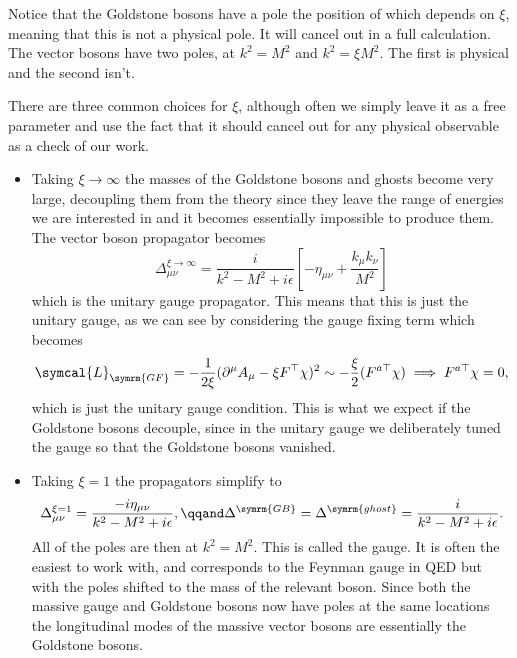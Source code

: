 \documentclass[fleqn]{NotesClass}
\newcommand{\lagrangianDensity}{\symcal{L}}
\newcommand{\minkowskiMetric}{\eta}
\newcommand{\trans}{\top}
\begin{document}
    Notice that the Goldstone bosons have a pole the position of which depends on \(\xi\), meaning that this is not a physical pole.
    It will cancel out in a full calculation.
    The vector bosons have two poles, at \(k^2 = M^2\) and \(k^2 = \xi M^2\).
    The first is physical and the second isn't.
    
    There are three common choices for \(\xi\), although often we simply leave it as a free parameter and use the fact that it should cancel out for any physical observable as a check of our work.
    \begin{itemize}
        \item Taking \(\xi \to \infty\) the masses of the Goldstone bosons and ghosts become very large, decoupling them from the theory since they leave the range of energies we are interested in and it becomes essentially impossible to produce them.
        The vector boson propagator becomes
        \begin{equation}
            \Delta_{\mu\nu}^{\xi \to \infty} = \frac{i}{k^2 - M^2 + i\epsilon} \left[ -\minkowskiMetric_{\mu\nu} + \frac{k_\mu k_\nu}{M^2} \right]
        \end{equation}
        which is the unitary gauge propagator.
        This means that this is just the unitary gauge, as we can see by considering the gauge fixing term which becomes
        \begin{equation}
            \lagrangianDensity_{\symrm{GF}} = -\frac{1}{2\xi}(\partial^\mu A_\mu - \xi F^\trans \chi)^2 \sim -\frac{\xi}{2}(F^{a\trans} \chi) \implies F^{a\trans}\chi = 0,
        \end{equation}
        which is just the unitary gauge condition.
        This is what we expect if the Goldstone bosons decouple, since in the unitary gauge we deliberately tuned the gauge so that the Goldstone bosons vanished.
        
        \item Taking \(\xi = 1\) the propagators simplify to
        \begin{equation*}
            \Delta_{\mu\nu}^{\xi = 1} = \frac{-i\minkowskiMetric_{\mu\nu}}{k^2 - M^2 + i\epsilon}, \qqand \Delta^{\symrm{GB}} = \Delta^{\symrm{ghost}} = \frac{i}{k^2 - M^2 + i\epsilon}.
        \end{equation*}
        All of the poles are then at \(k^2 = M^2\).
        This is called the  gauge.
        It is often the easiest to work with, and corresponds to the Feynman gauge in QED but with the poles shifted to the mass of the relevant boson.
        Since both the massive gauge and Goldstone bosons now have poles at the same locations the longitudinal modes of the massive vector bosons are essentially the Goldstone bosons.
        

\end{itemize}
\end{document}
